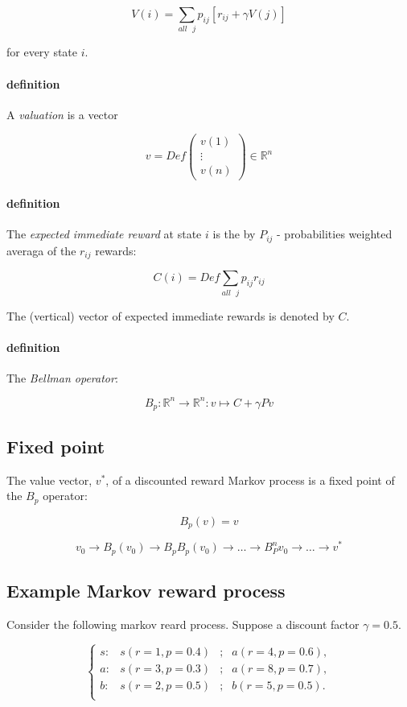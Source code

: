 \documentclass{article}
\begin{document}
\[V(i)=\sum_{all\mbox{\ }j} p_{ij}[r_{ij} + \gamma V(j)]\]

for every state $i$.

\paragraph{definition} A \emph{valuation} is a vector

\[v=Def
\begin{pmatrix}
	v(1) \\
	\vdots \\
	v(n)
\end{pmatrix}
\in \mathbb{R}^n
\]

\paragraph{definition} The \emph{expected immediate reward} at state $i$ is
the by $P_{ij}$ - probabilities weighted averaga of the $r_{ij}$ rewards:

\[C(i)=Def\sum_{all \mbox{\ }j} p_{ij} r_{ij} \]

The (vertical) vector of expected immediate rewards is denoted by $C$.

\paragraph{definition} The \emph{Bellman operator}:

\[B_p : \mathbb{R}^n \to \mathbb{R}^n : v \mapsto C + \gamma Pv \]

\subsection{Fixed point}
The value vector, $v^*$, of a discounted reward Markov process is a fixed
point of the $B_p$ operator:

\[ B_p(v)=v\]

\[
	v_0 \to B_p(v_0) \to B_p B_p (v_0) \to \dots \to B^n_P v_0
	\to \dots \to v^*
\]

\subsection{Example Markov reward process}
Consider the following markov reard process. Suppose a discount factor
$\gamma = 0.5$.

\[ \left\{ \begin{matrix}
		s: & s(r=1, p=0.4) & ; & a(r=4, p=0.6), \\
		a: & s(r=3, p=0.3) & ; & a(r=8, p=0.7), \\
		b: & s(r=2, p=0.5) & ; & b(r=5, p=0.5). \\
	\end{matrix}
\right. \]
\end{document}
